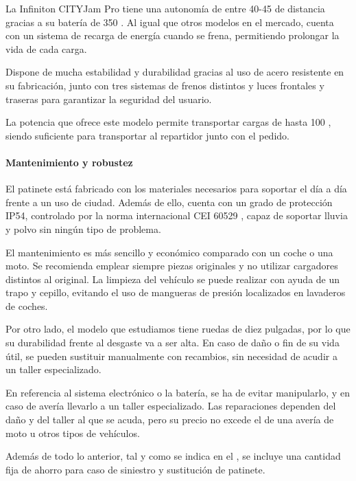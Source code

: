 La Infiniton CITYJam Pro tiene una autonomía de entre 40-45  de distancia gracias a su batería de 350 . Al igual que otros modelos en el mercado, cuenta con un sistema de recarga de energía cuando se frena, permitiendo prolongar la vida de cada carga.

Dispone de mucha estabilidad y durabilidad gracias al uso de acero resistente en su fabricación, junto con tres sistemas de frenos distintos y luces frontales y traseras para garantizar la seguridad del usuario.

La potencia que ofrece este modelo permite transportar cargas de hasta 100 , siendo suficiente para transportar al repartidor junto con el pedido.

\paragraph{Mantenimiento y robustez}

El patinete está fabricado con los materiales necesarios para soportar el día a día frente a un uso de ciudad. Además de ello, cuenta con un grado de protección IP54, controlado por la norma internacional CEI 60529 \cite{une60529}, capaz de soportar lluvia y polvo sin ningún tipo de problema.

El mantenimiento \cite{mantenimientopatinete} es más sencillo y económico comparado con un coche o una moto. Se recomienda emplear siempre piezas originales y no utilizar cargadores distintos al original. La limpieza del vehículo se puede realizar con ayuda de un trapo y cepillo, evitando el uso de mangueras de presión localizados en lavaderos de coches. 

Por otro lado, el modelo que estudiamos tiene ruedas de diez pulgadas, por lo que su durabilidad frente al desgaste va a ser alta. En caso de daño o fin de su vida útil, se pueden sustituir manualmente con recambios, sin necesidad de acudir a un taller especializado.

En referencia al sistema electrónico o la batería, se ha de evitar manipularlo, y en caso de avería llevarlo a un taller especializado. Las reparaciones dependen del daño y del taller al que se acuda, pero su precio no excede el de una avería de moto u otros tipos de vehículos.

Además de todo lo anterior, tal y como se indica en el , se incluye una cantidad fija de ahorro para caso de siniestro y sustitución de patinete.

